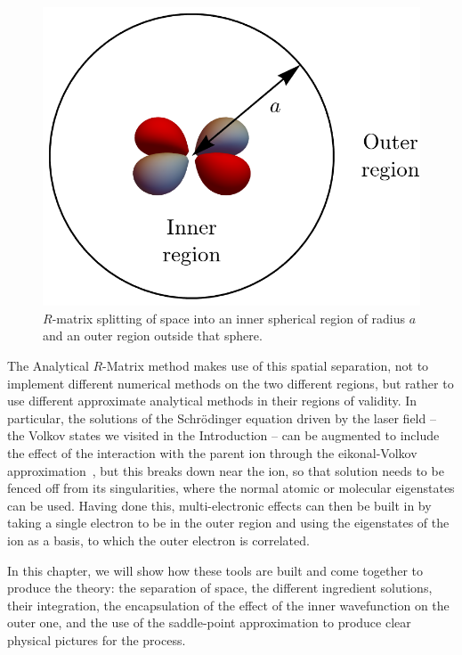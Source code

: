 \begin{figure}[b]
  \centering
  \includegraphics[scale=1]{2-ARM-theory/Figures/figure2E.png}
  \caption[$R$-matrix splitting of space]{$R$-matrix splitting of space into an inner spherical region of radius $a$ and an outer region outside that sphere.}
  \label{fig:2A-splitting-space}
\end{figure}

The Analytical $R$-Matrix method makes use of this spatial separation, not to implement different numerical methods on the two different regions, but rather to use different approximate analytical methods in their regions of validity. In particular, the solutions of the Schrödinger equation driven by the laser field -- the Volkov states we visited in the Introduction -- can be augmented to include the effect of the interaction with the parent ion through the eikonal-Volkov approximation~\cite{eikonalVolkov_initial, eikonalVolkov_prelim}, but this breaks down near the ion, so that solution needs to be fenced off from its singularities, where the normal atomic or molecular eigenstates can be used. Having done this, multi-electronic effects can then be built in by taking a single electron to be in the outer region and using the eigenstates of the ion as a basis, to which the outer electron is correlated.





In this chapter, we will show how these tools are built and come together to produce the theory: the separation of space, the different ingredient solutions, their integration, the encapsulation of the effect of the inner wavefunction on the outer one, and the use of the saddle-point approximation to produce clear physical pictures for the process.






